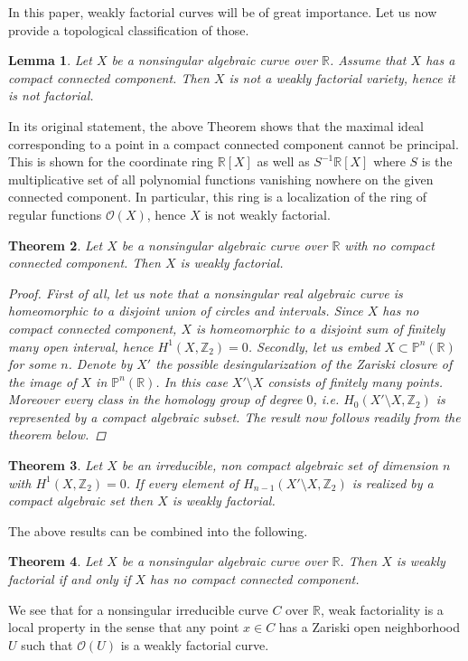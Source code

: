 \documentclass[12pt,reqno]{amsart}   	%
\newtheorem{thm}{Theorem}[section]
\newtheorem{lemma}[thm]{Lemma}
\theoremstyle{obs}
\theoremstyle{prob}
\theoremstyle{conj}
\theoremstyle{remark}
\newcommand{\Z}{\mathbb{Z}}
\newcommand{\R}{\mathbb{R}}
\newcommand{\OO}{\mathcal{O}}
\begin{document}
In this paper, weakly factorial curves will be of great importance. Let us now provide a topological classification of those.
\begin{lemma}\cite[Theorem 2.3]{gw1980}
Let $X$ be a nonsingular algebraic curve over $\R$. Assume that $X$ has a compact connected component. Then $X$ is not a weakly factorial variety, hence it is not factorial.
\end{lemma}
In its original statement, the above Theorem shows that the maximal ideal corresponding to a point in a compact connected component cannot be principal. This is shown for the coordinate ring $\R[X]$ as well as $S^{-1}\R[X]$ where $S$ is the multiplicative set of all polynomial functions vanishing nowhere on the given connected component. In particular, this ring is a localization of the ring of regular functions $\OO(X)$, hence $X$ is not weakly factorial.
\begin{thm}
Let $X$ be a nonsingular algebraic curve over $\R$ with no compact connected component. Then $X$ is weakly factorial.

\begin{proof}
First of all, let us note that a nonsingular real algebraic curve is homeomorphic to a disjoint union of circles and intervals. Since $X$ has no compact connected component, $X$ is homeomorphic to a disjoint sum of finitely many open interval, hence $H^1(X, \mathbb{Z}_2)=0$.
Secondly, let us embed $X \subset \mathbb{P}^n(\R)$ for some $n$. Denote by $X'$ the possible desingularization of the Zariski closure of the image of $X$ in $\mathbb{P}^n(\R)$. In this case $X'\setminus X$ consists of finitely many points. Moreover every class in the homology group of degree $0$, i.e. $H_0(X'\setminus X, \Z_2)$ is represented by a compact algebraic subset. The result now follows readily from the theorem below.

\end{proof}

\end{thm}

\begin{thm}\cite[Th\'eor\`eme 2]{shiota1981}
Let $X$ be an irreducible, non compact algebraic set of dimension $n$ with $H^1(X, \Z_2)=0$. If every element of $H_{n-1}(X'\setminus X, \Z_2)$ is realized by a compact algebraic set then $X$ is weakly factorial.
\end{thm}

The above results can be combined into the following.
\begin{thm}\label{class}
Let $X$ be a nonsingular algebraic curve over $\R$. Then $X$ is weakly factorial if and only if $X$ has no compact connected component.

\end{thm}
We see that for a nonsingular irreducible curve $C$ over $\R$, weak factoriality is a local property in the sense that any point $x \in C$ has a Zariski open neighborhood $U$ such that $\OO(U)$ is a weakly factorial curve.
\end{document}
